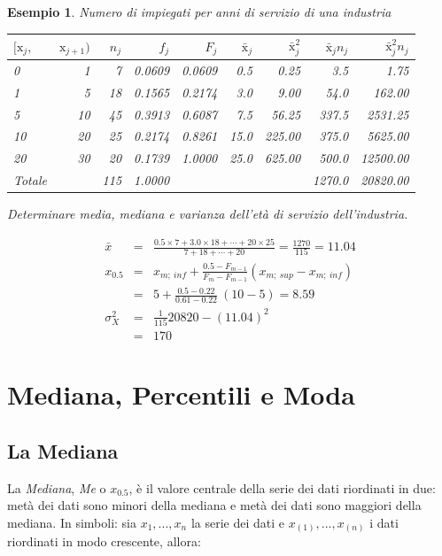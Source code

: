 \documentclass[
  11pt,
]{book}
\theoremstyle{mytheoremstyle}
\theoremstyle{mydefstyle}
\newtheorem{example}{{Esempio}}[section]
\begin{document}
\begin{example}
Numero di impiegati per anni di servizio di una industria

\begin{tabular}{lrrrrrrrr}
\toprule
$[\text{x}_j,$ & $\text{x}_{j+1})$ & $n_j$ & $f_j$ & $F_j$ & $\bar{\text{x}}_j$ & $\bar{\text{x}}_j^2$ & $\bar{\text{x}}_jn_j$ & $\bar{\text{x}}_j^2 n_j$\\
\midrule
0 & 1 & 7 & 0.0609 & 0.0609 & 0.5 & 0.25 & 3.5 & 1.75\\
1 & 5 & 18 & 0.1565 & 0.2174 & 3.0 & 9.00 & 54.0 & 162.00\\
5 & 10 & 45 & 0.3913 & 0.6087 & 7.5 & 56.25 & 337.5 & 2531.25\\
10 & 20 & 25 & 0.2174 & 0.8261 & 15.0 & 225.00 & 375.0 & 5625.00\\
20 & 30 & 20 & 0.1739 & 1.0000 & 25.0 & 625.00 & 500.0 & 12500.00\\
Totale &  & 115 & 1.0000 &  &  &  & 1270.0 & 20820.00\\
\bottomrule
\end{tabular}

Determinare media, mediana e varianza dell'età di servizio dell'industria.

\begin{eqnarray*}
    \bar{x}
&=& \frac{0.5 \times 7 + 3.0 \times 18 + \cdots + 20 \times 25}
    {7 + 18 + \cdots + 20}
 =  \frac{1270} {115} = 11.04                       \\
    x_{0.5}
&=& x_{m;\ inf} + \frac{0.5 - F_{m-1}} {F_{m} - F_{m-1}}   (x_{m;\ sup} - x_{m;\ inf})                          \\
&=& 5 + \frac{0.5 - 0.22} {0.61 - 0.22}\ (10 - 5) = 8.59 \\
\sigma_X^2 &=& \frac{1}{115}20820-(11.04)^2\\
&=& 170
\end{eqnarray*}
\end{example}

\chapter{Mediana, Percentili e Moda}\label{mediana-percentili-e-moda}

\section{La Mediana}\label{mediana}

La \emph{Mediana}, \emph{Me} o \(x_{0.5}\), è il valore centrale della serie dei dati riordinati in due: metà dei dati sono minori della mediana e metà dei dati sono maggiori della mediana.
In simboli: sia \(x_{1},...,x_{n}\) la serie dei dati e \(x_{(1)},...,x_{(n)}\) i dati riordinati in modo crescente, allora:
\end{document}
